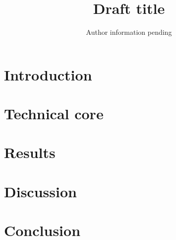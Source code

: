 \documentclass[aps,prl,twocolumn,amsmath,amssymb,floatfix]{revtex4-2}
\begin{document}
\title{Draft title}
\author{Author information pending}
\begin{abstract}
\end{abstract}
\maketitle
\section{Introduction}
\section{Technical core}
\section{Results}
\section{Discussion}
\section{Conclusion}


\end{document}

